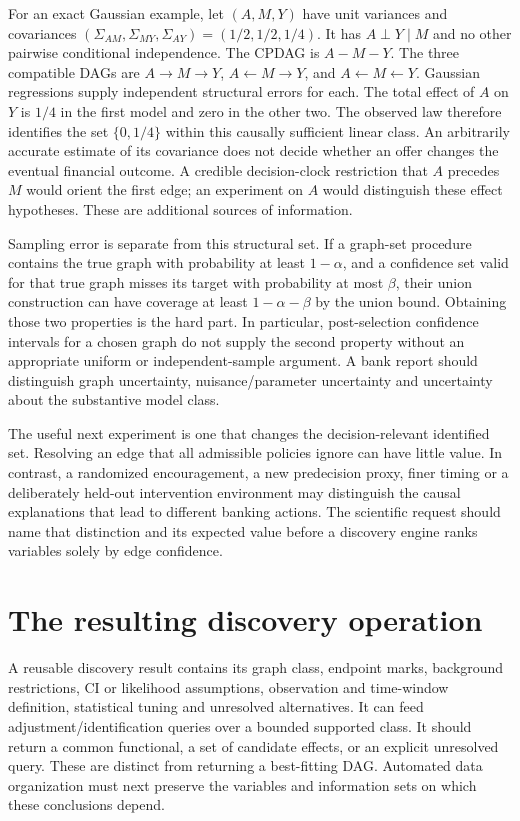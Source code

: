 For an exact Gaussian example, let $(A,M,Y)$ have unit variances and
covariances $(\Sigma_{AM},\Sigma_{MY},\Sigma_{AY})=(1/2,1/2,1/4)$.
It has $A\perp Y\mid M$ and no other pairwise conditional
independence. The CPDAG is $A-M-Y$. The three compatible DAGs are
$A\to M\to Y$, $A\leftarrow M\to Y$, and
$A\leftarrow M\leftarrow Y$. Gaussian regressions supply independent
structural errors for each. The total effect of $A$ on $Y$ is $1/4$
in the first model and zero in the other two. The observed law therefore
identifies the set $\{0,1/4\}$ within this causally sufficient linear
class. An arbitrarily accurate estimate of its covariance does not
decide whether an offer changes the eventual financial outcome.
A credible decision-clock restriction that $A$ precedes $M$ would
orient the first edge; an experiment on $A$ would distinguish these
effect hypotheses. These are additional sources of information.

Sampling error is separate from this structural set. If a graph-set
procedure contains the true graph with probability at least $1-\alpha$,
and a confidence set valid for that true graph misses its target with
probability at most $\beta$, their union construction can have coverage
at least $1-\alpha-\beta$ by the union bound. Obtaining those two
properties is the hard part. In particular, post-selection confidence
intervals for a chosen graph do not supply the second property without
an appropriate uniform or independent-sample argument. A bank report
should distinguish graph uncertainty, nuisance/parameter uncertainty
and uncertainty about the substantive model class.

The useful next experiment is one that changes the decision-relevant
identified set. Resolving an edge that all admissible policies ignore
can have little value. In contrast, a randomized encouragement, a new
predecision proxy, finer timing or a deliberately held-out intervention
environment may distinguish the causal explanations that lead to
different banking actions. The scientific request should name that
distinction and its expected value before a discovery engine ranks
variables solely by edge confidence.

\section{The resulting discovery operation}
A reusable discovery result contains its graph class, endpoint marks,
background restrictions, CI or likelihood assumptions, observation and
time-window definition, statistical tuning and unresolved alternatives.
It can feed adjustment/identification queries over a bounded supported
class. It should return a common functional, a set of candidate effects,
or an explicit unresolved query. These are distinct from returning a
best-fitting DAG. Automated data organization must next preserve the
variables and information sets on which these conclusions depend.






